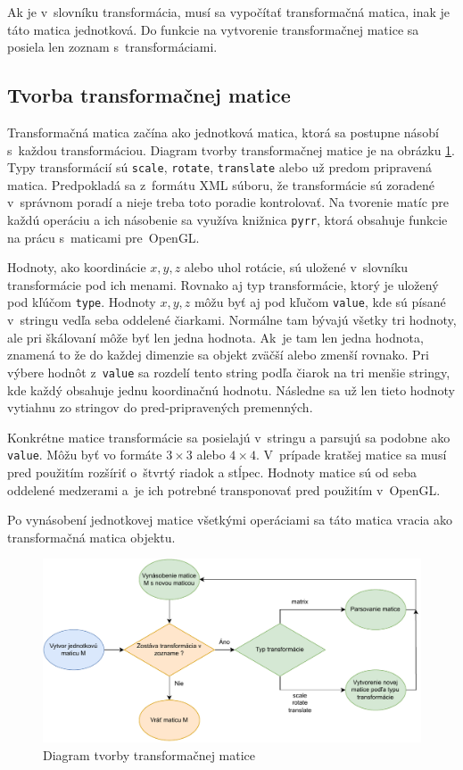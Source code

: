Ak je v~slovníku transformácia, musí sa vypočítať transformačná matica, inak je táto matica jednotková. Do funkcie na vytvorenie transformačnej matice sa posiela len zoznam s~transformáciami.

\subsection*{Tvorba transformačnej matice}
Transformačná matica začína ako jednotková matica, ktorá sa postupne násobí s~každou transformáciou. Diagram tvorby transformačnej matice je na obrázku \ref{TransMatrixDia}. Typy transformácií sú \verb|scale|, \verb|rotate|, \verb|translate| alebo už predom pripravená matica. Predpokladá sa z~formátu XML súboru, že transformácie sú zoradené v~správnom poradí a nieje treba toto poradie kontrolovať. Na tvorenie matíc pre každú operáciu a ich násobenie sa využíva knižnica \verb|pyrr|, ktorá obsahuje funkcie na prácu s~maticami pre~OpenGL.

Hodnoty, ako koordinácie $x,y,z$ alebo uhol rotácie, sú uložené v~slovníku transformácie pod ich menami. Rovnako aj typ transformácie, ktorý je uložený pod kľúčom \verb|type|. Hodnoty $x,y,z$ môžu byť aj pod kľučom \verb|value|, kde sú písané v~stringu vedľa seba oddelené čiarkami. Normálne tam bývajú všetky tri hodnoty, ale pri škálovaní môže byť len jedna hodnota. Ak~je tam len jedna hodnota, znamená to že do každej dimenzie sa objekt zväčší alebo zmenší rovnako. Pri výbere hodnôt z~\verb|value| sa rozdelí tento string podľa čiarok na tri menšie stringy, kde každý obsahuje jednu koordinačnú hodnotu. Následne sa už len tieto hodnoty vytiahnu zo stringov do pred-pripravených premenných.

Konkrétne matice transformácie sa posielajú v~stringu a parsujú sa podobne ako \verb|value|. Môžu byť vo formáte $3 \times 3$ alebo $4 \times 4$. V~prípade kratšej matice sa musí pred použitím rozšíriť o~štvrtý riadok a stĺpec. Hodnoty matice sú od seba oddelené medzerami a~je ich potrebné transponovať pred použitím v~OpenGL.

Po vynásobení jednotkovej matice všetkými operáciami sa táto matica vracia ako transformačná matica objektu.

\begin{figure}[t!] \label{TransMatrixDia}
    \centering
    \includegraphics[width=0.90\linewidth]{obrazky-figures/TransformationMatrix.drawio.pdf}
    \caption{Diagram tvorby transformačnej matice}
\end{figure}

